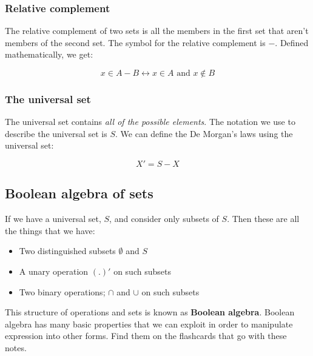 \subsubsection{Relative complement}

The relative complement of two sets is all the members in the first set that
aren't members of the second set. The symbol for the relative complement is $-$.
Defined mathematically, we get:

\begin{dmath}
	{x \in A - B} \leftrightarrow {x \in A \textrm{ and } x \notin B}
\end{dmath}

\subsubsection{The universal set}
\label{subsubsec:universal_set}

The universal set contains {\it all of the possible elements}. The notation we
use to describe the universal set is $S$. We can define the De Morgan's laws
using the universal set:

\begin{dmath}
	X' = S - X
\end{dmath}

\subsection{Boolean algebra of sets}

If we have a universal set, $S$, and consider only subsets of $S$. Then these
are all the things that we have:

\begin{itemize}
	\item Two distinguished subsets $\emptyset$ and $S$
	\item A unary operation $(.)'$ on such subsets
	\item Two binary operations; $\cap$ and $\cup$ on such subsets
\end{itemize}

This structure of operations and sets is known as {\bf Boolean algebra}. Boolean
algebra has many basic properties that we can exploit in order to manipulate
expression into other forms. Find them on the flashcards that go with these
notes.


